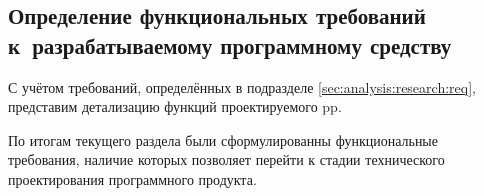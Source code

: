 \subsection{Определение функциональных требований к~разрабатываемому программному средству}
\label{sec:analysis:research:funcreq}

С учётом требований, определённых в подразделе \ref{sec:analysis:research:req}, представим детализацию функций проектируемого \gls{pp}.








По итогам текущего раздела были сформулированны функциональные требования, наличие которых позволяет перейти к стадии технического проектирования программного продукта.



